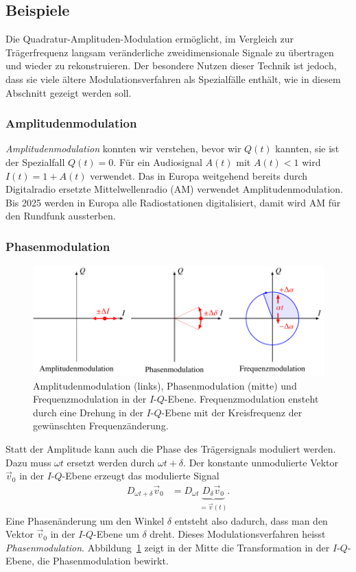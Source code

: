%
%
%
\subsection{Beispiele
\label{subsection:qam:beispiele}}
Die Quadratur-Amplituden-Modulation ermöglicht, im Vergleich zur
Trägerfrequenz langsam veränderliche zweidimensionale Signale zu
übertragen und wieder zu rekonstruieren.
Der besondere Nutzen dieser Technik ist jedoch, dass sie viele
ältere Modulationsverfahren als Spezialfälle enthält, wie in
diesem Abschnitt gezeigt werden soll.

\subsubsection{Amplitudenmodulation}
{\em Amplitudenmodulation} konnten wir verstehen, bevor wir $Q(t)$ kannten,
sie ist der Spezialfall $Q(t)=0$.
Für ein Audiosignal $A(t)$ mit $A(t)<1$ wird $I(t)=1+A(t)$ verwendet.
Das in Europa weitgehend bereits durch Digitalradio ersetzte 
Mittelwellenradio (AM) verwendet Amplitudenmodulation.
Bis 2025 werden in Europa alle Radiostationen digitalisiert, damit
wird AM für den Rundfunk aussterben.

\subsubsection{Phasenmodulation}
\begin{figure}
\centering
\includegraphics{applications/qam/images/amfmpm.pdf}
\caption{Amplitudenmodulation (links), Phasenmodulation (mitte) und
Frequenzmodulation in der $I$-$Q$-Ebene.
Frequenzmodulation ensteht durch eine Drehung in der $I$-$Q$-Ebene
mit der Kreisfrequenz der gewünschten Frequenzänderung.
\label{qam:figure:amfmpm}}
\end{figure}
Statt der Amplitude kann auch die Phase des Trägersignals moduliert werden.
Dazu muss $\omega t$ ersetzt werden durch $\omega t + \delta$.
Der konstante unmodulierte Vektor $\vec{v}_0$ in der $I$-$Q$-Ebene erzeugt
das modulierte Signal
\begin{align*}
D_{\omega t + \delta}
\vec{v}_0
&=
D_{\omega t}\underbrace{D_{\delta} \vec{v}_0}_{\displaystyle=\vec{v}(t)}.
\end{align*}
Eine Phasenänderung um den Winkel $\delta$ entsteht also dadurch, dass
man den Vektor $\vec{v}_0$ in der $I$-$Q$-Ebene um $\delta$ dreht.
Dieses Modulationsverfahren heisst {\em Phasenmodulation}.
Abbildung~\ref{qam:figure:amfmpm} zeigt in der Mitte die Transformation
in der $I$-$Q$-Ebene, die Phasenmodulation bewirkt.

